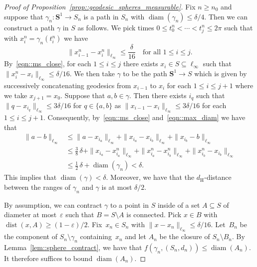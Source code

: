 \documentclass[10pt]{amsart}
\let\epsilon\varepsilon
\theoremstyle{plain}
\numberwithin{theorem}{section}
\theoremstyle{definition}
\renewcommand{\S}{{\mathbf S}}
\DeclareMathOperator{\dist}{dist}
\DeclareMathOperator{\diam}{diam}
\renewcommand{\dh}{d_{\mathrm{H}}}
\begin{document}
\begin{proof}[Proof of Proposition~\ref{prop::geodesic_spheres_measurable}]
Fix $n \geq n_0$ and suppose that $\gamma_n \colon \S^1 \to S_n$ is a path in $S_n$ with $\diam(\gamma_n) \leq \delta/4$. Then we can construct a path $\gamma$ in $S$ as follows. We pick times $0 \leq t_0^n < \cdots < t_j^n \leq 2\pi$ such that with $x_i^n = \gamma_n(t_i^n)$ we have
\begin{equation}
\label{eqn::max_diam}
\| x_{i-1}^n - x_i^n \|_{\ell_\infty} \leq \frac{\delta}{16} \quad\text{for all } 1\leq i \leq j.
\end{equation}
By~\eqref{eqn::ms_close}, for each $1 \leq i \leq j$ there exists $x_i \in S \subseteq \ell_\infty$ such that $\| x_i^n - x_i \|_{\ell_\infty} \leq \delta/16$. We then take $\gamma$ to be the path $\S^1 \to S$ which is given by successively concatenating geodesics from $x_{i-1}$ to $x_i$ for each $1 \leq i \leq j+1$ where we take $x_{j+1} = x_0$. Suppose that $a,b \in \gamma$. Then there exists $i_q$ such that $\| q - x_{i_q} \|_{\ell_\infty} \leq 3 \delta/16$ for $q \in \{a,b\}$ as $\|x_{i-1}-x_i\|_{\ell_\infty} \leq 3\delta/16$ for each $1 \leq i \leq j+1$. Consequently, by~\eqref{eqn::ms_close} and~\eqref{eqn::max_diam} we have that
\begin{align*}
\|a-b\|_{\ell_\infty}
&\leq \|a-x_{i_a}\|_{\ell_\infty} + \|x_{i_a} - x_{i_b}\|_{\ell_\infty} + \|x_{i_b} - b\|_{\ell_\infty}\\
&\leq \frac{3}{8}\,\delta + \|x_{i_a} - x_{i_a}^n\|_{\ell_\infty} + \|x_{i_a}^n - x_{i_b}^n\|_{\ell_\infty} + \|x_{i_b}^n - x_{i_b}\|_{\ell_\infty}\\
&\leq \frac{1}{2}\,\delta + \diam(\gamma_n) < \delta.
\end{align*}
This implies that $\diam(\gamma) < \delta$. Moreover, we have that the $\dh$-distance between the ranges of $\gamma_n$ and $\gamma$ is at most $\delta/2$.

By assumption, we can contract $\gamma$ to a point in $S$ inside of a set $A \subseteq S$ of diameter at most~$\epsilon$ such that $B = S \setminus A$ is connected. Pick $x \in B$ with $\dist(x,A) \geq (1-\epsilon)/2$. Fix~$x_n \in S_n$ with $\| x-x_n \|_{\ell_\infty} \leq \delta/16$. Let~$B_n$ be the component of $S_n \setminus \gamma_n$ containing~$x_n$ and let $A_n$ be the closure of $S_n \setminus B_n$. By Lemma~\ref{lem::sphere_contract}, we have that $f(\gamma_n,(S_n,d_n)) \leq \diam(A_n)$. It therefore suffices to bound $\diam(A_n)$.


\end{proof}
\end{document}
